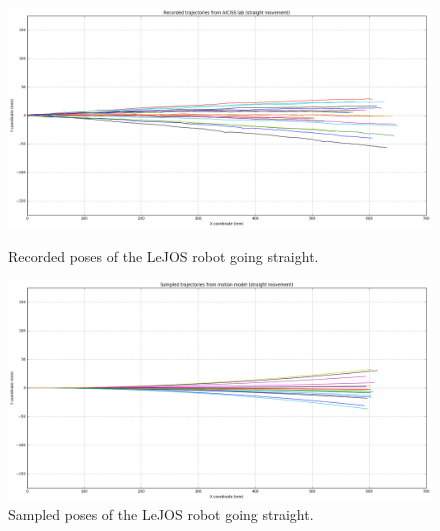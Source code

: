 \documentclass[paper=a4, fontsize=11pt]{scrartcl} %
\begin{document}
    \begin{figure}[H]
        \centering
        \begin{minipage}{\textwidth}
            \centering
            \includegraphics[width=1\textwidth]{images/recorded_poses_straight.png} %
            \caption{Recorded poses of the LeJOS robot going straight.}
        \end{minipage}\hfill
        \begin{minipage}{\textwidth}
            \centering
            \includegraphics[width=1\textwidth]{images/sampled_poses_straight.png} %
            \caption{Sampled poses of the LeJOS robot going straight.}
        \end{minipage}
    \end{figure}
    
\end{document}
